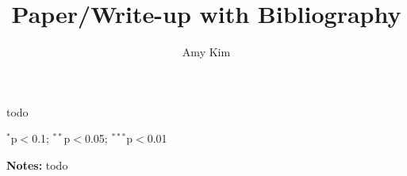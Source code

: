 \documentclass[12pt]{article}
\title{Paper/Write-up with Bibliography}
\author{Amy Kim}
\begin{document}
\maketitle

\newpage

\begin{table}[!h]
    \centering 
    \renewcommand{\arraystretch}{1.1}
    \begin{threeparttable}
        \caption{todo}
        \label{tab:summstats}
        
        \begin{tablenotes}
            \item $^{*}$p$<$0.1; $^{**}$p$<$0.05; $^{***}$p$<$0.01
            \item 
            \item \textbf{Notes:} todo
        \end{tablenotes}
    \end{threeparttable}
\end{table}
\end{document}
